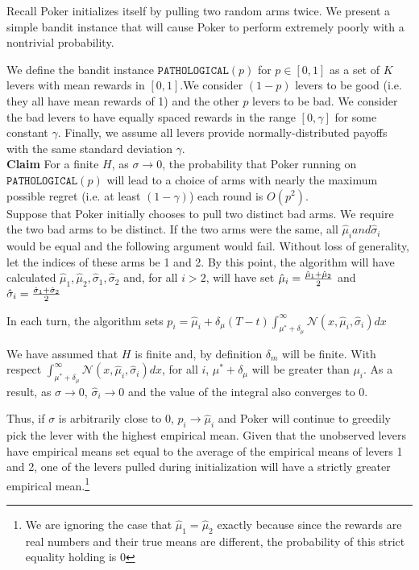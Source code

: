 \documentclass[12pt]{article}
\begin{document}
Recall Poker initializes itself by pulling two random arms twice. We present a simple bandit instance that will cause Poker to perform extremely poorly with a nontrivial probability.

We define the bandit instance $\texttt{PATHOLOGICAL}(p)$ for $p \in [0,1]$ as a set of $K$ levers with mean rewards in $[0,1]$.We consider $(1-p)$ levers to be good (i.e. they all have mean rewards of 1) and the other $p$ levers to be bad. We consider the bad levers to have equally spaced rewards in the range $[0,\gamma]$ for some constant $\gamma$. Finally, we assume all levers provide normally-distributed payoffs with the same standard deviation $\gamma$. \\

\noindent
\textbf{Claim} For a finite $H$, as $\sigma \rightarrow 0$, the probability that Poker running on $\texttt{PATHOLOGICAL}(p)$ will lead to a choice of arms with nearly the maximum possible regret (i.e. at least $(1-\gamma)$) each round is $O(p^{2})$. \\ 

Suppose that Poker initially chooses to pull two distinct bad arms. We require the two bad arms to be distinct. If the two arms were the same, all $\hat{\mu}_{i} and \hat{\sigma}_{i}$ would be equal and the following argument would fail. Without loss of generality, let the indices of these arms be 1 and 2. By this point, the algorithm will have calculated $\hat{\mu}_{1}, \hat{\mu}_{2}, \hat{\sigma}_{1},\hat{\sigma}_{2}$ and, for all $i > 2$, will have set $\hat{\mu}_{i}= {\hat{\mu}_{1}+\hat{\mu}_{2}\over 2}$ and $\hat{\sigma}_{i} = {\hat{\sigma}_{1}+\hat{\sigma}_{2}\over 2}$

In each turn, the algorithm sets $p_{i} = \hat{\mu}_{i} + \delta_{\mu}(T-t)\int_{\mu^{*}+\delta_{\mu}}^{\infty}\mathcal{N}(x,\hat{\mu}_{i}, \hat{\sigma}_{i})dx$

We have assumed that $H$ is finite and, by definition $\delta_{m}$ will be finite. With respect $\int_{\mu^{*}+\delta_{\mu}}^{\infty}\mathcal{N}(x,\hat{\mu}_{i}, \hat{\sigma}_{i})dx$, for all $i$, $\mu^{*}+\delta_{\mu}$ will be greater than $\mu_{i}$. As a result, as $\sigma \to 0$, $\hat{\sigma}_{i} \to 0$ and the value of the integral also converges to 0.

Thus, if $\sigma$ is arbitrarily close to $0$, $p_{i} \rightarrow \hat{\mu}_{i}$ and Poker will continue to greedily pick the lever with the highest empirical mean. Given that the unobserved levers have empirical means set equal to the average of the empirical means of levers 1 and 2, one of the levers pulled during initialization will have a strictly greater empirical mean.\footnote{We are ignoring the case that $\hat{\mu}_{1} = \hat{\mu}_{2}$ exactly because since the rewards are real numbers and their true means are different, the probability of this strict equality holding is 0}
\end{document}
